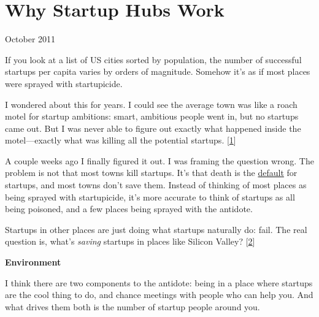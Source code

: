 \chapter{Why Startup Hubs Work}


            
              
                


                  
                    October 2011

If you look at a list of US cities
                    sorted by population, the number of successful startups per
                    capita varies by orders of magnitude. Somehow it's as if
                    most places were sprayed with startupicide.

I
                    wondered about this for years. I could see the average town
                    was like a roach motel for startup ambitions: smart,
                    ambitious people went in, but no startups came out. But I
                    was never able to figure out exactly what happened inside
                    the motel---exactly what was killing all the potential
                    startups.
                    [\href{\#f1n}{1}]

A couple weeks ago I finally figured it out. I
                    was framing the question wrong. The problem is not that most
                    towns kill startups. It's that death is the
                    \href{http://www.paulgraham.com/die.html}{default} for startups, and most towns
                    don't save them. Instead of thinking of most places as being
                    sprayed with startupicide, it's more accurate to think of
                    startups as all being poisoned, and a few places being
                    sprayed with the antidote.

Startups in other
                    places are just doing what startups naturally do: fail. The
                    real question is, what's \emph{saving} startups in places
                    like Silicon Valley?
                    [\href{\#f2n}{2}]

\textbf{Environment}

I think there are
                    two components to the antidote: being in a place where
                    startups are the cool thing to do, and chance meetings with
                    people who can help you. And what drives them both is the
                    number of startup people around you.

